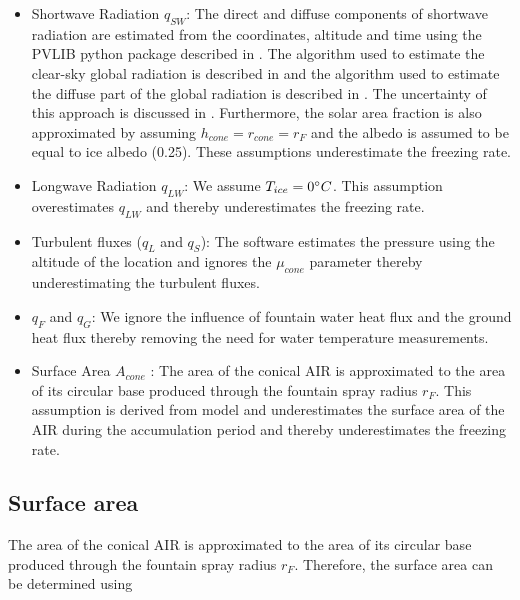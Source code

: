\documentclass[tc, manuscript]{copernicus}
\begin{document}
\begin{itemize}

  \item Shortwave Radiation $q_{SW}$: The direct and diffuse components of shortwave radiation are estimated from the coordinates,
    altitude and time using the PVLIB python package described in \citet{holmgrenPvlibPythonPython2018} . The
    algorithm used to estimate the clear-sky global radiation is described in
    \citet{ineichenBroadbandSimplifiedVersion2008} and the algorithm used to estimate the diffuse part of the
    global radiation is described in \citet{erbsEstimationDiffuseRadiation1982}. The uncertainty of this approach
    is discussed in \cite{ineichenValidationModelsThat2016}. Furthermore, the solar area fraction is also
    approximated by assuming $h_{cone} = r_{cone} = r_{F}$ and the albedo is assumed to be equal to ice albedo
    (0.25). These assumptions underestimate the freezing rate.

  \item Longwave Radiation $q_{LW}$: We assume $T_{ice} = 0 ^{\circ} C$. This assumption overestimates $q_{LW}$
    and thereby underestimates the freezing rate.

  \item Turbulent fluxes ($q_{L}$ and $q_{S}$): The software estimates the pressure using the altitude of the
    location and ignores the $\mu_{cone}$ parameter thereby underestimating the turbulent fluxes.

  \item $q_{F}$ and $q_{G}$: We ignore the influence of fountain water heat flux and the ground heat flux
    thereby removing the need for water temperature measurements.

  \item Surface Area $A_{cone}$ : The area of the conical AIR is approximated to the area of its circular base
    produced through the fountain spray radius $r_F$. This assumption is derived from
    \cite{oerlemansBriefCommunicationGrowth2021} model and underestimates the surface area of the AIR during the
    accumulation period and thereby underestimates the freezing rate.

\end{itemize}

\subsection{Surface area}

The area of the conical AIR is approximated to the area of its circular base produced through the fountain spray
radius $r_F$. Therefore, the surface area can be determined using
\end{document}

